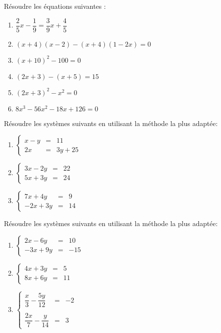 \begin{exercice}
Résoudre les équations suivantes :
\begin{enumerate}
\item $\dfrac{2}{5}x-\dfrac{1}{9}=\dfrac{3}{9}x+\dfrac{4}{5}$
\item $(x+4)(x-2)-(x+4)(1-2x)=0$
\item $(x+10)^2-100=0$
\item $(2x+3)-(x+5)=15$
\item $(2x+3)^2-x^2=0$
\item $8x^3-56x^2-18x+126=0$
\end{enumerate}
\end{exercice}


\begin{exercice}
Résoudre les systèmes suivants en utilisant la méthode la plus adaptée:

\begin{enumerate}

 \item $\left\lbrace\begin{array}{lll}
x-y&=& 11\\
2x&=& 3y+25
\end{array}\right.$

\item $\left\lbrace\begin{array}{lll}
 3x-2y&=&22 \\
 5x+3y&=&24
\end{array}\right.$

\item $\left\lbrace\begin{array}{lll}
 7x+4y&=&9 \\
 -2x+3y&=&14
\end{array}\right.$
\end{enumerate}
\end{exercice}


\begin{exercice}
Résoudre les systèmes suivants en utilisant la méthode la plus adaptée:

\begin{enumerate}
\item $\left\lbrace\begin{array}{lll}
 2x-6y&=&10 \\
 -3x+9y&=&-15
\end{array}\right.$

\item $\left\lbrace\begin{array}{lll}
4x+3y&=& 5\\
8x+6y&=& 11
\end{array}\right.$

 \item $\left\lbrace\begin{array}{lll}
\dfrac{x}{3}-\dfrac{5y}{12}&=& -2\\\\
\dfrac{2x}{7}-\dfrac{y}{14}&=& 3
\end{array}\right.$

\end{enumerate}
\end{exercice}

